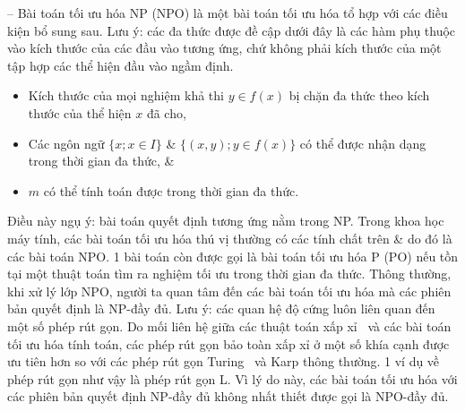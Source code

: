 \documentclass{article}
\begin{document}
-- Bài toán tối ưu hóa NP (NPO) là một bài toán tối ưu hóa tổ hợp với các điều kiện bổ sung sau. Lưu ý: các đa thức được đề cập dưới đây là các hàm phụ thuộc vào kích thước của các đầu vào tương ứng, chứ không phải kích thước của một tập hợp các thể hiện đầu vào ngầm định.
\begin{itemize}
    \item Kích thước của mọi nghiệm khả thi $y\in f(x)$ bị chặn đa thức theo kích thước của thể hiện $x$ đã cho,
    \item Các ngôn ngữ $\{x;x\in I\}$ \& $\{(x,y);y\in f(x)\}$ có thể được nhận dạng trong thời gian đa thức, \&
    \item $m$ có thể tính toán được trong thời gian đa thức.
\end{itemize}
Điều này ngụ ý: bài toán quyết định tương ứng nằm trong NP. Trong khoa học máy tính, các bài toán tối ưu hóa thú vị thường có các tính chất trên \& do đó là các bài toán NPO. 1 bài toán còn được gọi là bài toán tối ưu hóa P (PO) nếu tồn tại một thuật toán tìm ra nghiệm tối ưu trong thời gian đa thức. Thông thường, khi xử lý lớp NPO, người ta quan tâm đến các bài toán tối ưu hóa mà các phiên bản quyết định là NP-đầy đủ. Lưu ý: các quan hệ độ cứng luôn liên quan đến một số phép rút gọn. Do mối liên hệ giữa các thuật toán xấp xỉ \ và các bài toán tối ưu hóa tính toán, các phép rút gọn bảo toàn xấp xỉ ở một số khía cạnh được ưu tiên hơn so với các phép rút gọn Turing \ và Karp thông thường. 1 ví dụ về phép rút gọn như vậy là phép rút gọn L. Vì lý do này, các bài toán tối ưu hóa với các phiên bản quyết định NP-đầy đủ không nhất thiết được gọi là NPO-đầy đủ.
\end{document}
